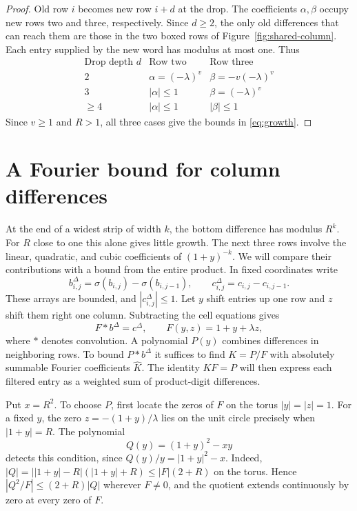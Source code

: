 \documentclass[11pt,reqno]{amsart}
\begin{document}
\begin{proof}
Old row \(i\) becomes new row \(i+d\) at the drop. The coefficients \(\alpha,\beta\) occupy new rows two and three, respectively. Since \(d\ge2\), the only old differences that can reach them are those in the two boxed rows of Figure~\ref{fig:shared-column}. Each entry supplied by the new word has modulus at most one. Thus
\[
\begin{array}{c|cc}
 \text{Drop depth }d & \text{Row two} & \text{Row three}\\ \hline
 2 & \alpha=(-\lambda)^v & \beta=-v(-\lambda)^v\\
 3 & |\alpha|\le1 & \beta=(-\lambda)^v\\
 \ge4 & |\alpha|\le1 & |\beta|\le1
\end{array}
\]
Since \(v\ge1\) and \(R>1\), all three cases give the bounds in \eqref{eq:growth}.
\end{proof}

\section{A Fourier bound for column differences}\label{sec:filter}
At the end of a widest strip of width \(k\), the bottom difference has modulus \(R^k\). For \(R\) close to one this alone gives little growth. The next three rows involve the linear, quadratic, and cubic coefficients of \((1+y)^{-k}\). We will compare their contributions with a bound from the entire product. In fixed coordinates write
\[
 b^\Delta_{i,j}=\sigma(b_{i,j})-\sigma(b_{i,j-1}),\qquad
 c^\Delta_{i,j}=c_{i,j}-c_{i,j-1}.
\]
These arrays are bounded, and \(|c^\Delta_{i,j}|\le1\). Let \(y\) shift entries up one row and \(z\) shift them right one column. Subtracting the cell equations gives
\[
 F*b^\Delta=c^\Delta,\qquad F(y,z)=1+y+\lambda z,
\]
where \(*\) denotes convolution. A polynomial \(P(y)\) combines differences in neighboring rows. To bound \(P*b^\Delta\) it suffices to find \(K=P/F\) with absolutely summable Fourier coefficients \(\widehat K\). The identity \(KF=P\) will then express each filtered entry as a weighted sum of product-digit differences.

Put \(x=R^2\). To choose \(P\), first locate the zeros of \(F\) on the torus \(|y|=|z|=1\). For a fixed \(y\), the zero \(z=-(1+y)/\lambda\) lies on the unit circle precisely when \(|1+y|=R\). The polynomial
\[
 Q(y)=(1+y)^2-xy
\]
detects this condition, since \(Q(y)/y=|1+y|^2-x\). Indeed, \(|Q|=\big||1+y|-R\big|(|1+y|+R)\le |F|(2+R)\) on the torus. Hence \(|Q^2/F|\le(2+R)|Q|\) wherever \(F\ne0\), and the quotient extends continuously by zero at every zero of \(F\).
\end{document}
